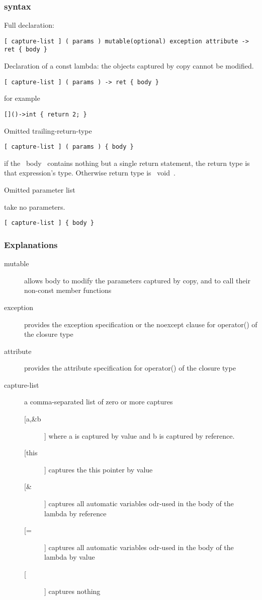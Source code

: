 \subsubsection{syntax}

Full declaration:

\begin{lstlisting}
[ capture-list ] ( params ) mutable(optional) exception attribute -> ret { body }
\end{lstlisting}

Declaration of a const lambda: the objects captured by copy cannot be modified.

\begin{lstlisting}
[ capture-list ] ( params ) -> ret { body }
\end{lstlisting}

for example

\begin{lstlisting}
[]()->int { return 2; }
\end{lstlisting}

Omitted trailing-return-type

\begin{lstlisting}
[ capture-list ] ( params ) { body }
\end{lstlisting}

if the ~body~ contains nothing but a single return statement, the return type is that expression's type. Otherwise return type is ~void~.

Omitted parameter list

take no parameters.

\begin{lstlisting}
[ capture-list ] { body }
\end{lstlisting}
\subsubsection{Explanations}
\begin{description}
\item [mutable] allows body to modify the parameters captured by copy, and to call their non-const member functions
\item [exception] provides the exception specification or the noexcept clause for operator() of the closure type
\item [attribute] provides the attribute specification for operator() of the closure type
\item [capture-list] a comma-separated list of zero or more captures
  \begin{description}
  \item [[a,\&b]] where a is captured by value and b is captured by reference.
  \item [[this]] captures the this pointer by value
  \item [[\&]] captures all automatic variables odr-used in the body of the lambda by reference
  \item [[=]] captures all automatic variables odr-used in the body of the lambda by value
  \item [[]] captures nothing
  \end{description}
\end{description}

